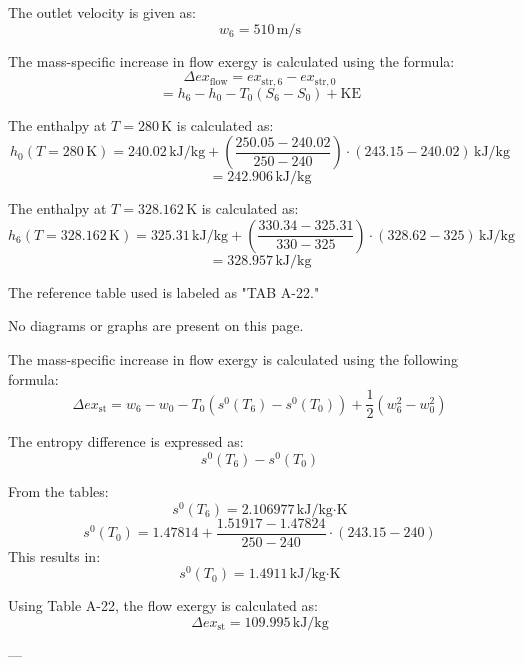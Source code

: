The outlet velocity is given as:  
\[
w_6 = 510 \, \text{m/s}
\]

The mass-specific increase in flow exergy is calculated using the formula:  
\[
\Delta ex_{\text{flow}} = ex_{\text{str},6} - ex_{\text{str},0}
\]
\[
= h_6 - h_0 - T_0(S_6 - S_0) + \text{KE}
\]

The enthalpy at \( T = 280 \, \text{K} \) is calculated as:  
\[
h_0(T = 280 \, \text{K}) = 240.02 \, \text{kJ/kg} + \left( \frac{250.05 - 240.02}{250 - 240} \right) \cdot (243.15 - 240.02) \, \text{kJ/kg}
\]
\[
= 242.906 \, \text{kJ/kg}
\]

The enthalpy at \( T = 328.162 \, \text{K} \) is calculated as:  
\[
h_6(T = 328.162 \, \text{K}) = 325.31 \, \text{kJ/kg} + \left( \frac{330.34 - 325.31}{330 - 325} \right) \cdot (328.62 - 325) \, \text{kJ/kg}
\]
\[
= 328.957 \, \text{kJ/kg}
\]

The reference table used is labeled as "TAB A-22."  

No diagrams or graphs are present on this page.

The mass-specific increase in flow exergy is calculated using the following formula:  
\[
\Delta ex_{\text{st}} = w_6 - w_0 - T_0 \left( s^0(T_6) - s^0(T_0) \right) + \frac{1}{2} \left( w_6^2 - w_0^2 \right)
\]  

The entropy difference is expressed as:  
\[
s^0(T_6) - s^0(T_0)
\]  

From the tables:  
\[
s^0(T_6) = 2.106977 \, \text{kJ/kg·K}
\]  
\[
s^0(T_0) = 1.47814 + \frac{1.51917 - 1.47824}{250 - 240} \cdot (243.15 - 240)
\]  
This results in:  
\[
s^0(T_0) = 1.4911 \, \text{kJ/kg·K}
\]  

Using Table A-22, the flow exergy is calculated as:  
\[
\Delta ex_{\text{st}} = 109.995 \, \text{kJ/kg}
\]  

---